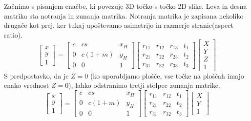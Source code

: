Začnimo s pisanjem enačbe, ki povezuje 3D točko s točko 2D slike. Leva in desna matrika sta notranja in zunanja matrika. Notranja matrika je zapisana nekoliko drugače kot prej, ker tukaj upoštevamo asimetrijo in razmerje stranic(aspect ratio).
\[
    \begin{bmatrix}
    x \\
    y \\
    1 
    \end{bmatrix}
    =
    \begin{bmatrix}
    c   &   cs  &   x_H \\
    0   &   c(1+m)  &   y_H \\
    0   &   0   &   1 
    \end{bmatrix}
    \begin{bmatrix}
    r_{11}   &   r_{12}  &  r_{13}  &   t_1 \\
    r_{21}   &   r_{22}  &  r_{23}  &   t_2 \\
    r_{31}   &   r_{32}  &  r_{33}  &   t_3
    \end{bmatrix}
    \begin{bmatrix}
        X \\
        Y \\
        Z \\
        1
    \end{bmatrix}
\]
S predpostavko, da je $Z=0$ (ko uporabljamo plošče, vse točke na ploščah imajo enako vrednost $Z=0$), lahko odstranimo tretji stolpec zunanja matrike.
\begin{equation}
    \begin{bmatrix}
    x \\
    y \\
    1 
    \end{bmatrix}
    =
    \begin{bmatrix}
    c   &   cs  &   x_H \\
    0   &   c(1+m)  &   y_H \\
    0   &   0   &   1 
    \end{bmatrix}
    \begin{bmatrix}
    r_{11}   &   r_{12}  &   t_1 \\
    r_{21}   &   r_{22}  &   t_2 \\
    r_{31}   &   r_{32}   &   t_3
    \end{bmatrix}
        \begin{bmatrix}
        X \\
        Y \\
        1
    \end{bmatrix}
    \label{simplifiedmappingLong}
\end{equation}
